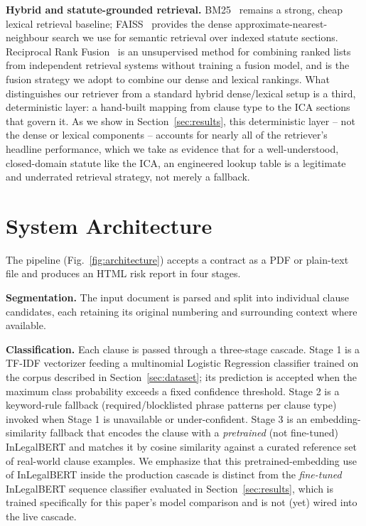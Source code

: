 \documentclass[conference]{IEEEtran}
\begin{document}
\textbf{Hybrid and statute-grounded retrieval.} BM25~\cite{bm252009} remains a strong, cheap lexical retrieval baseline; FAISS~\cite{faiss2019} provides the dense approximate-nearest-neighbour search we use for semantic retrieval over indexed statute sections. Reciprocal Rank Fusion~\cite{rrf2009} is an unsupervised method for combining ranked lists from independent retrieval systems without training a fusion model, and is the fusion strategy we adopt to combine our dense and lexical rankings. What distinguishes our retriever from a standard hybrid dense/lexical setup is a third, deterministic layer: a hand-built mapping from clause type to the ICA sections that govern it. As we show in Section~\ref{sec:results}, this deterministic layer -- not the dense or lexical components -- accounts for nearly all of the retriever's headline performance, which we take as evidence that for a well-understood, closed-domain statute like the ICA, an engineered lookup table is a legitimate and underrated retrieval strategy, not merely a fallback.

\section{System Architecture}
\label{sec:architecture}

The pipeline (Fig.~\ref{fig:architecture}) accepts a contract as a PDF or plain-text file and produces an HTML risk report in four stages.

\textbf{Segmentation.} The input document is parsed and split into individual clause candidates, each retaining its original numbering and surrounding context where available.

\textbf{Classification.} Each clause is passed through a three-stage cascade. Stage 1 is a TF-IDF vectorizer feeding a multinomial Logistic Regression classifier trained on the corpus described in Section~\ref{sec:dataset}; its prediction is accepted when the maximum class probability exceeds a fixed confidence threshold. Stage 2 is a keyword-rule fallback (required/blocklisted phrase patterns per clause type) invoked when Stage 1 is unavailable or under-confident. Stage 3 is an embedding-similarity fallback that encodes the clause with a \emph{pretrained} (not fine-tuned) InLegalBERT and matches it by cosine similarity against a curated reference set of real-world clause examples. We emphasize that this pretrained-embedding use of InLegalBERT inside the production cascade is distinct from the \emph{fine-tuned} InLegalBERT sequence classifier evaluated in Section~\ref{sec:results}, which is trained specifically for this paper's model comparison and is not (yet) wired into the live cascade.
\end{document}
